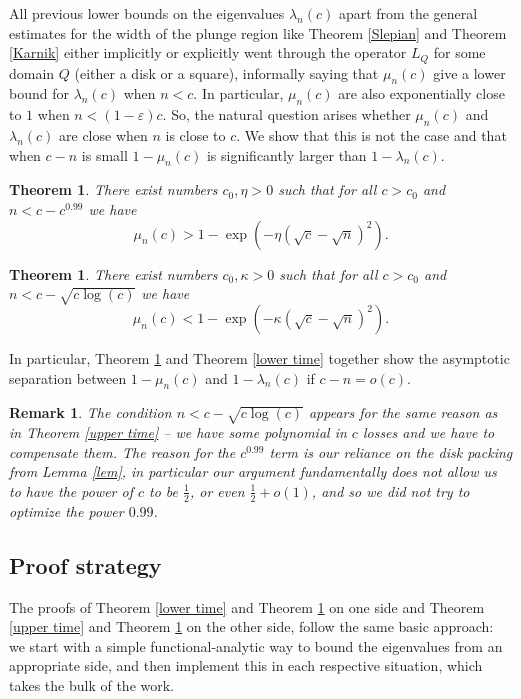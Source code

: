 \documentclass[12pt]{amsart}
\numberwithin{equation}{section}
\newcommand{\eps}{\varepsilon}
\newtheorem{theorem}[Thm]{Theorem}
\newtheorem{remark}[Thm]{Remark}
\begin{document}
All previous lower bounds on the eigenvalues $\lambda_n(c)$ apart from the general estimates for the width of the plunge region like Theorem \ref{Slepian} and Theorem \ref{Karnik} either implicitly or explicitly went through the operator $L_Q$ for some domain $Q$ (either a disk or a square), informally saying that $\mu_n(c)$ give a lower bound for $\lambda_n(c)$ when $n < c$. In particular, $\mu_n(c)$ are also exponentially close to $1$ when $n < (1-\eps)c$. So, the natural question arises whether $\mu_n(c)$ and $\lambda_n(c)$ are close when $n$ is close to $c$. We show that this is not the case and that when $c-n$ is small $1-\mu_n(c)$ is significantly larger than $1-\lambda_n(c)$.
\begin{theorem}\label{lower coherent}
There exist numbers $c_0, \eta > 0$ such that for all $c > c_0$ and $n < c-c^{0.99}$ we have
$$\mu_n(c) > 1 - \exp(-\eta (\sqrt{c}-\sqrt{n})^2).$$
\end{theorem}
\begin{theorem}\label{upper coherent}
There exist numbers $c_0, \kappa > 0$ such that for all $c > c_0$ and $n < c-\sqrt{c\log(c)}$ we have
$$\mu_n(c) < 1 - \exp(-\kappa (\sqrt{c}-\sqrt{n})^2).$$
\end{theorem}
In particular, Theorem \ref{upper coherent} and Theorem \ref{lower time} together show the asymptotic separation between $1-\mu_n(c)$ and $1-\lambda_n(c)$ if $c - n = o(c)$.
\begin{remark}The condition $n < c -\sqrt{c\log(c)}$ appears for the same reason as in Theorem \ref{upper time} -- we have some polynomial in $c$ losses and we have to compensate them. The reason for the $c^{0.99}$ term is our reliance on the disk packing from Lemma \ref{lem}, in particular our argument fundamentally does not allow us to have the power of $c$ to be $\frac{1}{2}$, or even $\frac{1}{2}+o(1)$, and so we did not try to optimize the power $0.99$.
\end{remark}
\subsection{Proof strategy} The proofs of Theorem \ref{lower time} and Theorem \ref{lower coherent} on one side and Theorem \ref{upper time} and Theorem \ref{upper coherent} on the other side, follow the same basic approach: we start with a simple functional-analytic way to bound the eigenvalues from an appropriate side, and then implement this in each respective situation, which takes the bulk of the work. 
\end{document}
